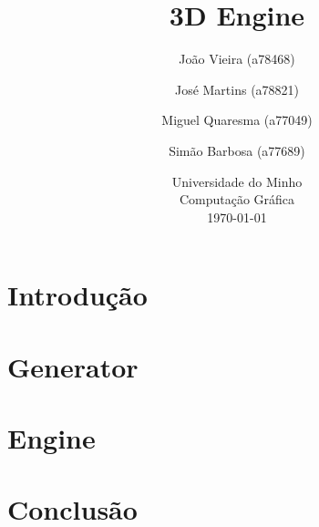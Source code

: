 \documentclass{article}
\begin{document}
\title{\vspace*{\fill}3D Engine}
\author{João Vieira (a78468) \and José Martins (a78821) \and Miguel Quaresma (a77049) \and Simão Barbosa (a77689)}
\date{%
    Universidade do Minho\\
    Computação Gráfica\\[2ex]%
    \today\vspace*{\fill}
}
\maketitle

\newpage

\tableofcontents

\newpage

\section{Introdução}

\section{Generator}

\section{Engine}

\section{Conclusão}
\end{document}
